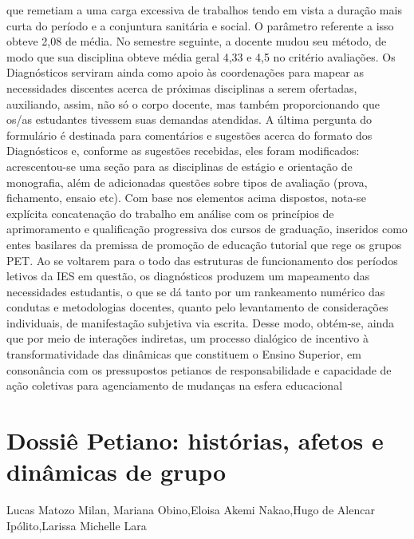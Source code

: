 que remetiam a uma carga excessiva de trabalhos tendo em vista a duração mais curta do período
e a conjuntura sanitária e social. O parâmetro referente a isso obteve 2,08 de média. No semestre
seguinte, a docente mudou seu método, de modo que sua disciplina obteve média geral 4,33 e 4,5
no critério avaliações. Os Diagnósticos serviram ainda como apoio às coordenações para mapear
as necessidades discentes acerca de próximas disciplinas a serem ofertadas, auxiliando, assim,
não só o corpo docente, mas também proporcionando que os/as estudantes tivessem suas
demandas atendidas. A última pergunta do formulário é destinada para comentários e sugestões
acerca do formato dos Diagnósticos e, conforme as sugestões recebidas, eles foram modificados:
acrescentou-se uma seção para as disciplinas de estágio e orientação de monografia, além de
adicionadas questões sobre tipos de avaliação (prova, fichamento, ensaio etc). Com base nos
elementos acima dispostos, nota-se explícita concatenação do trabalho em análise com os
princípios de aprimoramento e qualificação progressiva dos cursos de graduação, inseridos como
entes basilares da premissa de promoção de educação tutorial que rege os grupos PET. Ao se
voltarem para o todo das estruturas de funcionamento dos períodos letivos da IES em questão, os
diagnósticos produzem um mapeamento das necessidades estudantis, o que se dá tanto por um
rankeamento numérico das condutas e metodologias docentes, quanto pelo levantamento de
considerações individuais, de manifestação subjetiva via escrita. Desse modo, obtém-se, ainda
que por meio de interações indiretas, um processo dialógico de incentivo à transformatividade
das dinâmicas que constituem o Ensino Superior, em consonância com os pressupostos petianos
de responsabilidade e capacidade de ação coletivas para agenciamento de mudanças na esfera
educacional



\section{Dossiê Petiano: histórias, afetos e dinâmicas de grupo}

Lucas Matozo Milan, Mariana Obino,Eloisa Akemi Nakao,Hugo de Alencar Ipólito,Larissa Michelle Lara


